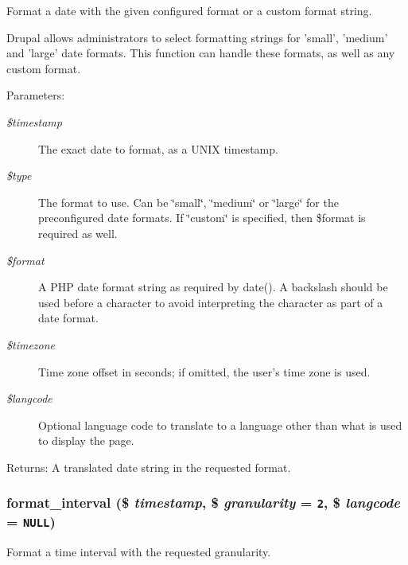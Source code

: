 Format a date with the given configured format or a custom format string.

Drupal allows administrators to select formatting strings for 'small', 'medium' and 'large' date formats. This function can handle these formats, as well as any custom format.

\begin{Desc}
\item[Parameters:]
\begin{description}
\item[{\em \$timestamp}]The exact date to format, as a UNIX timestamp. \item[{\em \$type}]The format to use. Can be \char`\"{}small\char`\"{}, \char`\"{}medium\char`\"{} or \char`\"{}large\char`\"{} for the preconfigured date formats. If \char`\"{}custom\char`\"{} is specified, then \$format is required as well. \item[{\em \$format}]A PHP date format string as required by date(). A backslash should be used before a character to avoid interpreting the character as part of a date format. \item[{\em \$timezone}]Time zone offset in seconds; if omitted, the user's time zone is used. \item[{\em \$langcode}]Optional language code to translate to a language other than what is used to display the page. \end{description}
\end{Desc}
\begin{Desc}
\item[Returns:]A translated date string in the requested format. \end{Desc}
\hypertarget{group__format_g583fbfbb3172036bef0b15bfa525679a}{
\subsubsection[{format\_\-interval}]{\setlength{\rightskip}{0pt plus 5cm}format\_\-interval (\$ {\em timestamp}, \/  \$ {\em granularity} = {\tt 2}, \/  \$ {\em langcode} = {\tt NULL})}}
\label{group__format_g583fbfbb3172036bef0b15bfa525679a}


Format a time interval with the requested granularity.

